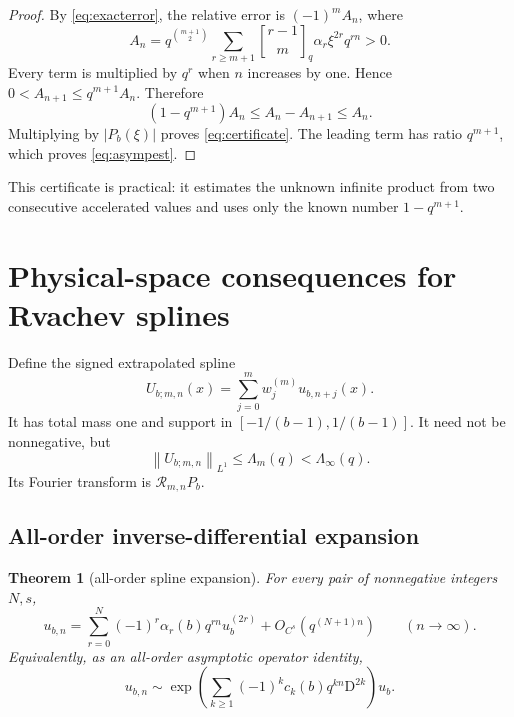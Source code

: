 \documentclass[11pt]{article}
\newtheorem{theorem}{Theorem}[section]
\theoremstyle{definition}
\theoremstyle{remark}
\newcommand{\D}{\mathrm{D}}
\newcommand{\norm}[1]{\left\lVert #1\right\rVert}
\newcommand{\abs}[1]{\left\lvert #1\right\rvert}
\newcommand{\qbinom}[2]{\genfrac{[}{]}{0pt}{}{#1}{#2}_{q}}
\begin{document}
\begin{proof}
By \eqref{eq:exacterror}, the relative error is \((-1)^mA_n\), where
\[
 A_n=q^{\binom{m+1}{2}}
 \sum_{r\geq m+1}\qbinom{r-1}{m}\alpha_r\xi^{2r}q^{rn}>0.
\]
Every term is multiplied by \(q^r\) when \(n\) increases by one. Hence
\(0<A_{n+1}\leq q^{m+1}A_n\). Therefore
\[
 (1-q^{m+1})A_n\leq A_n-A_{n+1}\leq A_n.
\]
Multiplying by \(\abs{P_b(\xi)}\) proves \eqref{eq:certificate}. The leading
term has ratio \(q^{m+1}\), which proves \eqref{eq:asympest}.
\end{proof}

This certificate is practical: it estimates the unknown infinite product from
two consecutive accelerated values and uses only the known number
\(1-q^{m+1}\).

\section{Physical-space consequences for Rvachev splines}
\label{sec:physical}

Define the signed extrapolated spline
\begin{equation}
 U_{b;m,n}(x)=\sum_{j=0}^m w_j^{(m)}u_{b,n+j}(x).
 \label{eq:Udef}
\end{equation}
It has total mass one and support in \([-1/(b-1),1/(b-1)]\). It need not be
nonnegative, but
\begin{equation}
 \norm{U_{b;m,n}}_{L^1}\leq\Lambda_m(q)<\Lambda_\infty(q).
 \label{eq:L1stable}
\end{equation}
Its Fourier transform is \(\mathcal R_{m,n}P_b\).

\subsection{All-order inverse-differential expansion}

\begin{theorem}[all-order spline expansion]
\label{thm:CinftyExpansion}
For every pair of nonnegative integers \(N,s\),
\begin{equation}
 u_{b,n}
 =\sum_{r=0}^{N}(-1)^r\alpha_r(b)q^{rn}u_b^{(2r)}
 +O_{C^s}\!\left(q^{(N+1)n}\right)
 \qquad(n\to\infty).
 \label{eq:physicalExpansion}
\end{equation}
Equivalently, as an all-order asymptotic operator identity,
\begin{equation}
 u_{b,n}\sim
 \exp\!\left(\sum_{k\geq1}(-1)^kc_k(b)q^{kn}\D^{2k}\right)u_b.
 \label{eq:operatorPhysical}
\end{equation}
\end{theorem}
\end{document}
